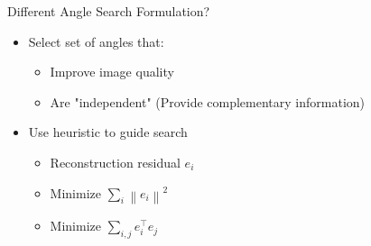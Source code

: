 \documentclass[english,aspectratio=43]{beamer}
\newcommand{\norm}[1]{\left\lVert#1\right\rVert}
\begin{document}
\begin{frame}{Different Angle Search Formulation?}
	\begin{itemize}
	    \setlength\itemsep{2em}
		    
		\item Select set of angles that:
	    \begin{itemize}
    		\item Improve image quality
    		\item Are "independent" (Provide complementary information)
            
    	\end{itemize}
        
        \item Use heuristic to guide search
        \begin{itemize}
    		\item Reconstruction residual $e_i$
    	    \item Minimize $\sum_i \norm{e_i}^2$
    	    \item Minimize $\sum_{i,j} e_i^\top e_j $
            
    	\end{itemize}
        
	\end{itemize}
\end{frame}




\end{document}
